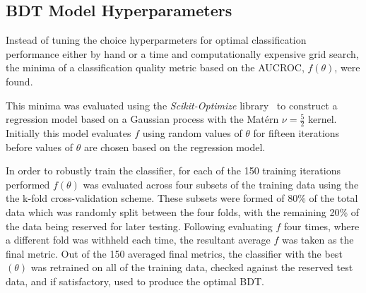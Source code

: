 \subsection{BDT Model Hyperparameters}\label{subsec:hyperparameters}
Instead of tuning the choice hyperparmeters for optimal classification performance either by hand or a time and computationally expensive grid search, the minima of a classification quality metric based on the AUCROC, $f(\theta)$, were found.

This minima was evaluated using the \emph{Scikit-Optimize} library~\cite{scikit-optimise} to construct a regression model based on a Gaussian process with the Mat\'{e}rn $\nu =\frac{5}{2}$ kernel.
Initially this model evaluates $f$ using random values of $\theta$ for fifteen iterations before values of $\theta$ are chosen based on the regression model.

In order to robustly train the classifier, for each of the 150 training iterations performed $f(\theta)$ was evaluated across four subsets of the training data using the the k-fold cross-validation scheme.
These subsets were formed of 80\% of the total data which was randomly split between the four folds, with the remaining 20\% of the data being reserved for later testing.
Following evaluating $f$ four times, where a different fold was withheld each time, the resultant average $f$ was taken as the final metric.
Out of the 150 averaged final metrics, the classifier with the best $(\theta)$ was retrained on all of the training data, checked against the reserved test data, and if satisfactory, used to produce the optimal BDT.

